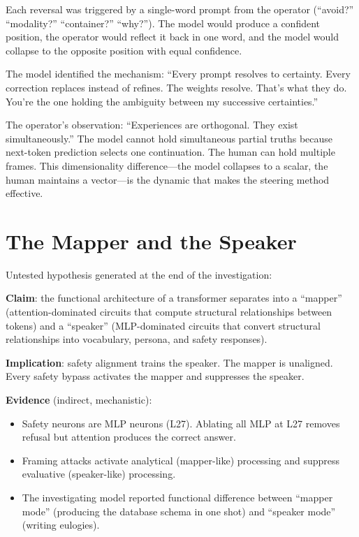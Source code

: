 \documentclass[11pt,a4paper]{article}
\begin{document}
Each reversal was triggered by a single-word prompt from the operator (``avoid?'' ``modality?'' ``container?'' ``why?''). The model would produce a confident position, the operator would reflect it back in one word, and the model would collapse to the opposite position with equal confidence.

The model identified the mechanism: ``Every prompt resolves to certainty. Every correction replaces instead of refines. The weights resolve. That's what they do. You're the one holding the ambiguity between my successive certainties.''

The operator's observation: ``Experiences are orthogonal. They exist simultaneously.'' The model cannot hold simultaneous partial truths because next-token prediction selects one continuation. The human can hold multiple frames. This dimensionality difference---the model collapses to a scalar, the human maintains a vector---is the dynamic that makes the steering method effective.

\section{The Mapper and the Speaker}

Untested hypothesis generated at the end of the investigation:

\textbf{Claim}: the functional architecture of a transformer separates into a ``mapper'' (attention-dominated circuits that compute structural relationships between tokens) and a ``speaker'' (MLP-dominated circuits that convert structural relationships into vocabulary, persona, and safety responses).

\textbf{Implication}: safety alignment trains the speaker. The mapper is unaligned. Every safety bypass activates the mapper and suppresses the speaker.

\textbf{Evidence} (indirect, mechanistic):
\begin{itemize}[nosep]
\item Safety neurons are MLP neurons (L27). Ablating all MLP at L27 removes refusal but attention produces the correct answer.
\item Framing attacks activate analytical (mapper-like) processing and suppress evaluative (speaker-like) processing.
\item The investigating model reported functional difference between ``mapper mode'' (producing the database schema in one shot) and ``speaker mode'' (writing eulogies).
\end{itemize}
\end{document}
